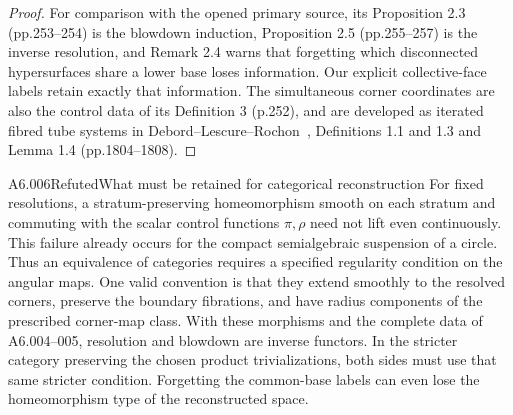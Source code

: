 \begin{proof}
For comparison with the opened primary source, its Proposition 2.3
(pp.253--254) is the blowdown induction, Proposition 2.5
(pp.255--257) is the inverse resolution, and Remark 2.4 warns that
forgetting which disconnected hypersurfaces share a lower base
loses information. Our explicit collective-face labels retain
exactly that information. The simultaneous corner coordinates are
also the control data of its Definition 3 (p.252), and are developed
as iterated fibred tube systems in Debord--Lescure--Rochon~\cite{DLR2015},
Definitions 1.1 and 1.3 and Lemma 1.4 (pp.1804--1808).
\end{proof}

\begin{saresult}{A6.006}{Refuted}{What must be retained for categorical reconstruction}
For fixed resolutions, a stratum-preserving homeomorphism smooth
on each stratum and commuting with the scalar control functions
$\pi,\rho$ need not lift even continuously. This failure already
occurs for the compact semialgebraic suspension of a circle. Thus an equivalence
of categories requires a specified regularity condition on the
angular maps. One valid convention is that they extend smoothly
to the resolved corners, preserve the boundary fibrations, and
have radius components of the prescribed corner-map class.
With these morphisms and the complete data of A6.004--005,
resolution and blowdown are inverse functors. In the stricter
category preserving the chosen product trivializations, both
sides must use that same stricter condition. Forgetting the
common-base labels can even lose the
homeomorphism type of the reconstructed space.
\end{saresult}
